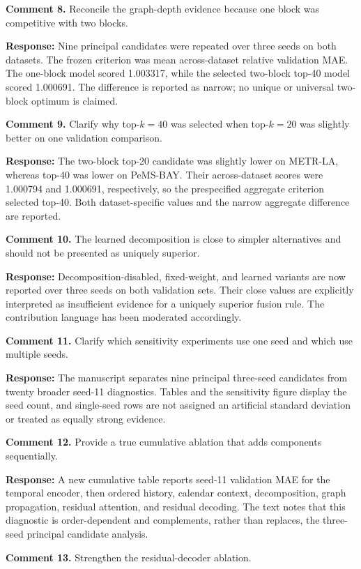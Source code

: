 \documentclass[11pt]{article}
\newcommand{\response}[1]{\par\noindent\textcolor{responseblue}{\textbf{Response:} #1}\par}
\begin{document}
\textbf{Comment 8.} Reconcile the graph-depth evidence because one block was competitive with two blocks.

\response{Nine principal candidates were repeated over three seeds on both datasets. The frozen criterion was mean across-dataset relative validation MAE. The one-block model scored 1.003317, while the selected two-block top-40 model scored 1.000691. The difference is reported as narrow; no unique or universal two-block optimum is claimed.}

\textbf{Comment 9.} Clarify why top-$k=40$ was selected when top-$k=20$ was slightly better on one validation comparison.

\response{The two-block top-20 candidate was slightly lower on METR-LA, whereas top-40 was lower on PeMS-BAY. Their across-dataset scores were 1.000794 and 1.000691, respectively, so the prespecified aggregate criterion selected top-40. Both dataset-specific values and the narrow aggregate difference are reported.}

\textbf{Comment 10.} The learned decomposition is close to simpler alternatives and should not be presented as uniquely superior.

\response{Decomposition-disabled, fixed-weight, and learned variants are now reported over three seeds on both validation sets. Their close values are explicitly interpreted as insufficient evidence for a uniquely superior fusion rule. The contribution language has been moderated accordingly.}

\textbf{Comment 11.} Clarify which sensitivity experiments use one seed and which use multiple seeds.

\response{The manuscript separates nine principal three-seed candidates from twenty broader seed-11 diagnostics. Tables and the sensitivity figure display the seed count, and single-seed rows are not assigned an artificial standard deviation or treated as equally strong evidence.}

\textbf{Comment 12.} Provide a true cumulative ablation that adds components sequentially.

\response{A new cumulative table reports seed-11 validation MAE for the temporal encoder, then ordered history, calendar context, decomposition, graph propagation, residual attention, and residual decoding. The text notes that this diagnostic is order-dependent and complements, rather than replaces, the three-seed principal candidate analysis.}

\textbf{Comment 13.} Strengthen the residual-decoder ablation.
\end{document}
